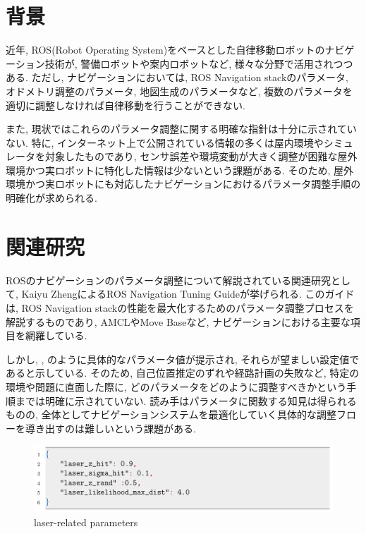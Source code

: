 
\section{背景}
近年, ROS(Robot Operating System)をベースとした自律移動ロボットのナビゲーション技術が, 警備ロボットや案内ロボットなど, 様々な分野で活用されつつある. 
ただし, ナビゲーションにおいては, ROS Navigation stack\cite{navstack}のパラメータ, オドメトリ調整のパラメータ, 地図生成のパラメータなど, 複数のパラメータを
適切に調整しなければ自律移動を行うことができない. 

また, 現状ではこれらのパラメータ調整に関する明確な指針は十分に示されていない. 
特に, インターネット上で公開されている情報の多くは屋内環境やシミュレータを対象したものであり, 
センサ誤差や環境変動が大きく調整が困難な屋外環境かつ実ロボットに特化した情報は少ないという課題がある. 
そのため, 屋外環境かつ実ロボットにも対応したナビゲーションにおけるパラメータ調整手順の明確化が求められる. 
\newpage
\section{関連研究}
ROSのナビゲーションのパラメータ調整について解説されている関連研究として, Kaiyu Zheng\cite{zheng2017rosnavigation}によるROS Navigation Tuning Guideが挙げられる. 
このガイドは, ROS Navigation stackの性能を最大化するためのパラメータ調整プロセスを解説するものであり, AMCLやMove Baseなど, ナビゲーションにおける主要な項目を網羅している. 

しかし, , のように具体的なパラメータ値が提示され, それらが望ましい設定値であると示している. 
そのため, 自己位置推定のずれや経路計画の失敗など, 特定の環境や問題に直面した際に, どのパラメータをどのように調整すべきかという手順までは明確に示されていない. 
読み手はパラメータに関数する知見は得られるものの, 全体としてナビゲーションシステムを最適化していく具体的な調整フローを導き出すのは難しいという課題がある. 
\begin{figure}[hbtp]
  \centering
 \includegraphics[keepaspectratio, scale=0.3]
      {images/senkou_1.png}
 \caption{laser-related parameters}
 \label{Fig:laser-related parameters}
\end{figure}


